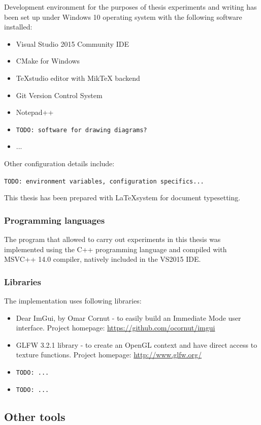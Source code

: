 \documentclass[12pt]{report}
\newcommand{\todo}[1]{}
\renewcommand{\todo}[1]{{\color{red} \par \noindent \footnotesize \texttt{TODO: {#1} }}}
\begin{document}
Development environment for the purposes of thesis experiments and writing has been set up under Windows 10 operating system with the following software installed:

\begin{itemize}
	\item Visual Studio 2015 Community IDE
	\item CMake for Windows
	\item TeXstudio editor with MikTeX backend
	\item Git Version Control System
	\item Notepad++ 
	\item \todo{software for drawing diagrams?}
	\item ...
\end{itemize}

Other configuration details include: \todo{environment variables, configuration specifics...} 

This thesis has been prepared with \LaTeX\space system for document typesetting.

 
\subsubsection{Programming languages} 

The program that allowed to carry out experiments in this thesis was implemented using the C++ programming language and compiled with MSVC++ 14.0 compiler, natively included in the VS2015 IDE.  

\subsubsection{Libraries} 

The implementation uses following libraries:
\begin{itemize}
	\item Dear ImGui, by Omar Cornut - to easily build an Immediate Mode user interface. Project homepage:  \url{https://github.com/ocornut/imgui}
	\item GLFW 3.2.1 library - to create an OpenGL context and have direct access to texture functions. Project homepage: \url{http://www.glfw.org/}
	\item \todo{...}
	\item \todo{...}
\end{itemize}  
 

\subsection{Other tools }
\end{document}
